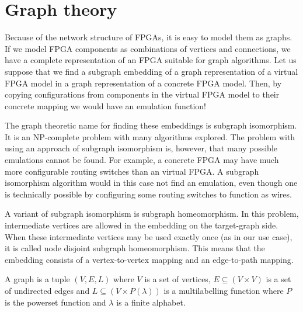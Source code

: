 \section{Graph theory}
Because of the network structure of FPGAs, it is easy to model them as graphs. If we model FPGA components as combinations of vertices and connections, we have a complete representation of an FPGA suitable for graph algorithms. Let us suppose that we find a subgraph embedding of a graph representation of a virtual FPGA model in a graph representation of a concrete FPGA model. Then, by copying configurations from components in the virtual FPGA model to their concrete mapping we would have an emulation function!

The graph theoretic name for finding these embeddings is subgraph isomorphism. It is an NP-complete problem with many algorithms explored. The problem with using an approach of subgraph isomorphism is, however, that many possible emulations cannot be found. For example, a concrete FPGA may have much more configurable routing switches than an virtual FPGA. A subgraph isomorphism algorithm would in this case not find an emulation, even though one is technically possible by configuring some routing switches to function as wires.

A variant of subgraph isomorphism is subgraph homeomorphism. In this problem, intermediate vertices are allowed in the embedding on the target-graph side. When these intermediate vertices may be used exactly once (as in our use case), it is called node disjoint subgraph homeomorphism. This means that the embedding consists of a vertex-to-vertex mapping and an edge-to-path mapping.


\begin{defn}[graph]
A graph is a tuple $(V, E, L)$ where $V$ is a set of vertices, $E \subseteq (V \times V)$ is a set of undirected edges and $L \subseteq (V \times P(\lambda))$ is a multilabelling function where $P$ is the powerset function and $\lambda$ is a finite alphabet.
\label{def:graph}
\end{defn}



